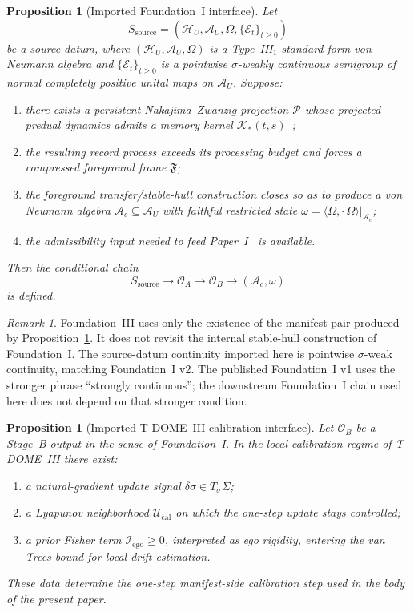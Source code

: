 \documentclass[12pt]{article}
\newtheorem{proposition}[theorem]{Proposition}
\theoremstyle{definition}
\theoremstyle{remark}
\newtheorem{remark}[theorem]{Remark}
\begin{document}
\begin{proposition}[Imported Foundation~I interface]\label{prop:A1}
Let
\[
S_{\mathrm{source}}
=
(\mathcal H_U,\mathcal A_U,\Omega,\{\mathcal E_t\}_{t\ge0})
\]
be a source datum, where
\((\mathcal H_U,\mathcal A_U,\Omega)\) is a Type~III\(_1\) standard-form
von Neumann algebra and
\(\{\mathcal E_t\}_{t\ge0}\) is a pointwise \(\sigma\)-weakly
continuous semigroup of normal completely positive unital maps on
\(\mathcal A_U\). Suppose:
\begin{enumerate}
\item there exists a persistent Nakajima--Zwanzig projection
  \(\mathcal P\) whose projected predual dynamics admits a memory kernel
  \(\mathcal K_*(t,s)\)~\cite{Nakajima1958,Zwanzig1960,BreuerPetruccione2002};
\item the resulting record process exceeds its processing budget and
  forces a compressed foreground frame \(\mathfrak F\);
\item the foreground transfer/stable-hull construction closes so as to
  produce a von Neumann algebra \(\mathcal A_c\subseteq\mathcal A_U\)
  with faithful restricted state
  \(\omega=\langle\Omega,\cdot\,\Omega\rangle|_{\mathcal A_c}\);
\item the admissibility input needed to feed Paper~I~\cite{PaperI} is
  available.
\end{enumerate}
Then the conditional chain
\[
S_{\mathrm{source}}
\to
\mathcal O_A
\to
\mathcal O_B
\to
(\mathcal A_c,\omega)
\]
is defined.
\end{proposition}

\begin{remark}
Foundation~III uses only the existence of the manifest pair produced by
Proposition~\ref{prop:A1}. It does not revisit the internal stable-hull
construction of Foundation~I. The source-datum continuity imported here
is pointwise \(\sigma\)-weak continuity, matching Foundation~I v2. The
published Foundation~I v1 uses the stronger phrase ``strongly
continuous''; the downstream Foundation~I chain used here does not
depend on that stronger condition.
\end{remark}

\begin{proposition}[Imported T-DOME~III calibration interface]
\label{prop:A2}
Let \(\mathcal O_B\) be a Stage~B output in the sense of
Foundation~I. In the local calibration regime of T-DOME~III there exist:
\begin{enumerate}
\item a natural-gradient update signal
  \(\delta\sigma\in T_\sigma\Sigma\);
\item a Lyapunov neighborhood \(\mathcal U_{\mathrm{cal}}\) on which the
  one-step update stays controlled;
\item a prior Fisher term \(\mathcal I_{\mathrm{ego}}\ge0\), interpreted
  as ego rigidity, entering the van Trees bound for local drift
  estimation.
\end{enumerate}
These data determine the one-step manifest-side calibration step used in
the body of the present paper.
\end{proposition}
\end{document}
